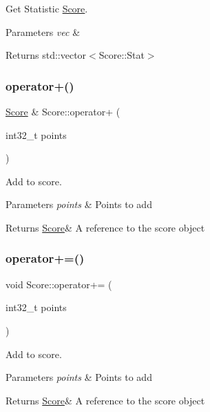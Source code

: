 Get Statistic \hyperlink{class_score}{Score}. 


\begin{DoxyParams}{Parameters}
{\em vec} & \\
\hline
\end{DoxyParams}
\begin{DoxyReturn}{Returns}
std\+::vector$<$\+Score\+::\+Stat$>$ 
\end{DoxyReturn}
\mbox{\label{class_score_a57078d193a0196f8589e9b6ff44043b9}} 
\subsubsection{\texorpdfstring{operator+()}{operator+()}}
{\footnotesize\ttfamily \hyperlink{class_score}{Score} \& Score\+::operator+ (\begin{DoxyParamCaption}\item[{int32\+\_\+t}]{points }\end{DoxyParamCaption})}



Add to score. 


\begin{DoxyParams}{Parameters}
{\em points} & Points to add \\
\hline
\end{DoxyParams}
\begin{DoxyReturn}{Returns}
\hyperlink{class_score}{Score}\& A reference to the score object 
\end{DoxyReturn}
\mbox{\label{class_score_aa09c8d15c82ba3edcd2ae56d8cf413ab}} 
\subsubsection{\texorpdfstring{operator+=()}{operator+=()}}
{\footnotesize\ttfamily void Score\+::operator+= (\begin{DoxyParamCaption}\item[{int32\+\_\+t}]{points }\end{DoxyParamCaption})}



Add to score. 


\begin{DoxyParams}{Parameters}
{\em points} & Points to add \\
\hline
\end{DoxyParams}
\begin{DoxyReturn}{Returns}
\hyperlink{class_score}{Score}\& A reference to the score object 
\end{DoxyReturn}
\mbox{\label{class_score_ada72aeab821258696786fdac3c6705fb}} 
